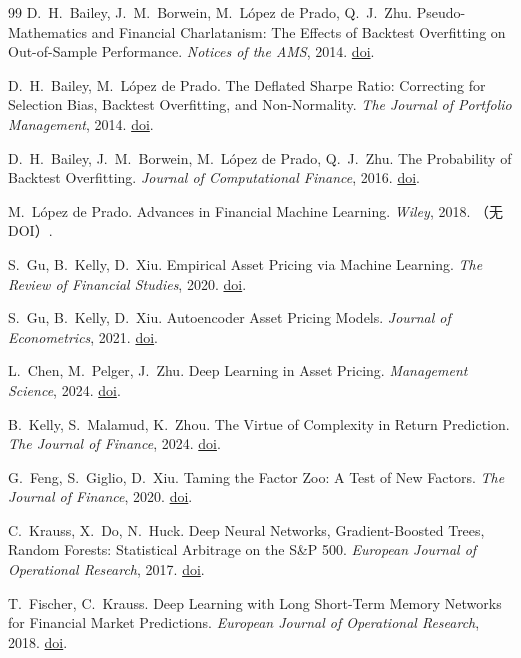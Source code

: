 \begin{thebibliography}{99}
 D.~H.~Bailey, J.~M.~Borwein, M.~L\'opez de Prado, Q.~J.~Zhu. Pseudo-Mathematics and Financial Charlatanism: The Effects of Backtest Overfitting on Out-of-Sample Performance. \emph{Notices of the AMS}, 2014. \href{https://doi.org/10.1090/noti1105}{doi}.

 D.~H.~Bailey, M.~L\'opez de Prado. The Deflated Sharpe Ratio: Correcting for Selection Bias, Backtest Overfitting, and Non-Normality. \emph{The Journal of Portfolio Management}, 2014. \href{https://doi.org/10.3905/jpm.2014.40.5.094}{doi}.

 D.~H.~Bailey, J.~M.~Borwein, M.~L\'opez de Prado, Q.~J.~Zhu. The Probability of Backtest Overfitting. \emph{Journal of Computational Finance}, 2016. \href{https://doi.org/10.21314/jcf.2016.322}{doi}.

 M.~L\'opez de Prado. Advances in Financial Machine Learning. \emph{Wiley}, 2018. （无 DOI）.

 S.~Gu, B.~Kelly, D.~Xiu. Empirical Asset Pricing via Machine Learning. \emph{The Review of Financial Studies}, 2020. \href{https://doi.org/10.1093/rfs/hhaa009}{doi}.

 S.~Gu, B.~Kelly, D.~Xiu. Autoencoder Asset Pricing Models. \emph{Journal of Econometrics}, 2021. \href{https://doi.org/10.1016/j.jeconom.2020.07.009}{doi}.

 L.~Chen, M.~Pelger, J.~Zhu. Deep Learning in Asset Pricing. \emph{Management Science}, 2024. \href{https://doi.org/10.1287/mnsc.2023.4695}{doi}.

 B.~Kelly, S.~Malamud, K.~Zhou. The Virtue of Complexity in Return Prediction. \emph{The Journal of Finance}, 2024. \href{https://doi.org/10.1111/jofi.13298}{doi}.

 G.~Feng, S.~Giglio, D.~Xiu. Taming the Factor Zoo: A Test of New Factors. \emph{The Journal of Finance}, 2020. \href{https://doi.org/10.1111/jofi.12883}{doi}.

 C.~Krauss, X.~Do, N.~Huck. Deep Neural Networks, Gradient-Boosted Trees, Random Forests: Statistical Arbitrage on the S\&P 500. \emph{European Journal of Operational Research}, 2017. \href{https://doi.org/10.1016/j.ejor.2016.10.031}{doi}.

 T.~Fischer, C.~Krauss. Deep Learning with Long Short-Term Memory Networks for Financial Market Predictions. \emph{European Journal of Operational Research}, 2018. \href{https://doi.org/10.1016/j.ejor.2017.11.054}{doi}.


\end{thebibliography}
